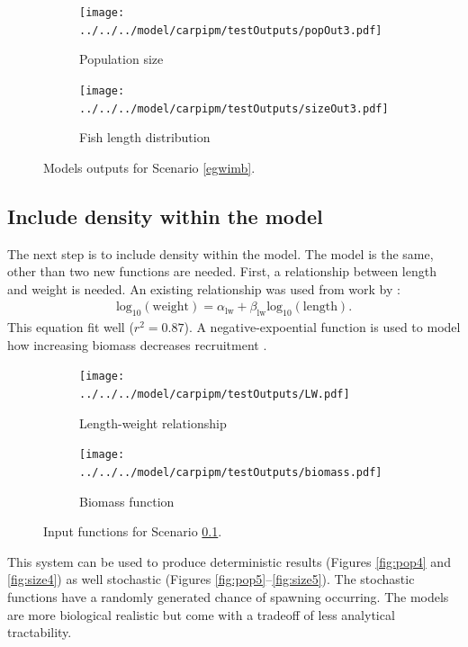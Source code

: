 \documentclass{article}[12pt]
\begin{document}
\begin{figure}[htbp]
	\centering
	\begin{subfigure}[b]{0.45\textwidth}
		\texttt{[image: ../../../model/carpipm/testOutputs/popOut3.pdf]} 
		\caption{Population size} 
		\label{fig:pop3}
	\end{subfigure}
	\qquad
	\begin{subfigure}[b]{0.45\textwidth}
		\texttt{[image: ../../../model/carpipm/testOutputs/sizeOut3.pdf]} 
		\caption{Fish length distribution} 
		\label{fig:size3}
	\end{subfigure}
   \caption{Models outputs for Scenario \ref{egwimb}.}
   \label{fig:scn3out}
\end{figure}

\subsection{Include density within the model}\label{idwitm}


The next step is to include density within the model.
The model is the same, other than two new functions are needed.
First, a relationship between length and weight is needed.
An existing relationship was used from work by \citet{wanner2009length}:
\begin{eqnarray}
\text{log}_{10} (\text{weight}) = \alpha_{\text{lw}} + \beta_\text{lw}\text{log}_{10} (\text{length}).
\end{eqnarray}
This equation fit well (\(r^2 = 0.87\)).
A negative-expoential function is used to model how increasing biomass decreases recruitment \citep[Figure \ref{fig:biomass};][]{bolker2008ecological}.



\begin{figure}[htbp]
	\centering
	\begin{subfigure}[b]{0.45\textwidth}
		\texttt{[image: ../../../model/carpipm/testOutputs/LW.pdf]} 
		\caption{Length-weight relationship} 
		\label{fig:lw}
	\end{subfigure}
	\qquad
	\begin{subfigure}[b]{0.45\textwidth}
		\texttt{[image: ../../../model/carpipm/testOutputs/biomass.pdf]} 
		\caption{Biomass function} 
		\label{fig:biomass}
	\end{subfigure}
   \caption{Input functions for Scenario \ref{idwitm}.}
   \label{fig:scn4}
\end{figure}

This system can be used to produce deterministic results (Figures \ref{fig:pop4} and \ref{fig:size4}) as well stochastic (Figures \ref{fig:pop5}--\ref{fig:size5}).
The stochastic functions have a randomly generated chance of spawning occurring.
The models are more biological realistic but come with a tradeoff of less analytical tractability.
\end{document}
